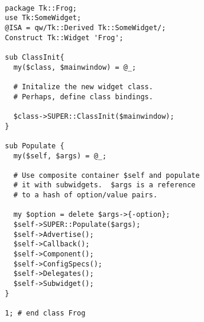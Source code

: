\begin{verbatim}

  package Tk::Frog;
  use Tk:SomeWidget;
  @ISA = qw/Tk::Derived Tk::SomeWidget/;
  Construct Tk::Widget 'Frog';

  sub ClassInit{
    my($class, $mainwindow) = @_;
   
    # Initalize the new widget class.
    # Perhaps, define class bindings.

    $class->SUPER::ClassInit($mainwindow);
  }

  sub Populate {
    my($self, $args) = @_;

    # Use composite container $self and populate
    # it with subwidgets.  $args is a reference
    # to a hash of option/value pairs.

    my $option = delete $args->{-option};
    $self->SUPER::Populate($args);
    $self->Advertise();
    $self->Callback();
    $self->Component();
    $self->ConfigSpecs();
    $self->Delegates();
    $self->Subwidget();
  }

  1; # end class Frog

\end{verbatim}

